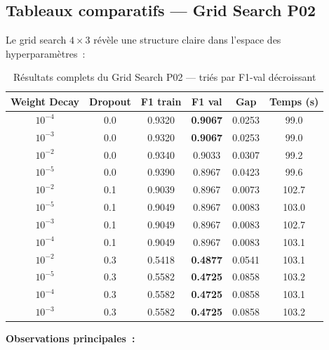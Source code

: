 \documentclass[12pt,a4paper]{article}
\newcommand{\best}[1]{\textcolor{bestgreen}{\textbf{#1}}}
\newcommand{\warn}[1]{\textcolor{warnred}{\textbf{#1}}}
\begin{document}
\subsection{Tableaux comparatifs — Grid Search P02}
\label{ssec:grid_results}

Le grid search $4 \times 3$ révèle une structure claire dans l'espace des
hyperparamètres~:

\begin{table}[H]
  \centering
  \caption{Résultats complets du Grid Search P02 — triés par F1-val décroissant}
  \label{tab:grid_results}
  \begin{tabular}{cccccc}
    \toprule
    \textbf{Weight Decay} & \textbf{Dropout} & \textbf{F1 train}
    & \textbf{F1 val} & \textbf{Gap} & \textbf{Temps (s)} \\
    \midrule
    \rowcolor{bestgreen!15}
    $10^{-4}$ & 0.0 & 0.9320 & \best{0.9067} & 0.0253 &  99.0 \\
    \rowcolor{bestgreen!15}
    $10^{-3}$ & 0.0 & 0.9320 & \best{0.9067} & 0.0253 &  99.0 \\
    $10^{-2}$ & 0.0 & 0.9340 & 0.9033       & 0.0307 &  99.2 \\
    $10^{-5}$ & 0.0 & 0.9390 & 0.8967       & 0.0423 &  99.6 \\
    $10^{-2}$ & 0.1 & 0.9039 & 0.8967       & 0.0073 & 102.7 \\
    $10^{-5}$ & 0.1 & 0.9049 & 0.8967       & 0.0083 & 103.0 \\
    $10^{-3}$ & 0.1 & 0.9049 & 0.8967       & 0.0083 & 102.7 \\
    $10^{-4}$ & 0.1 & 0.9049 & 0.8967       & 0.0083 & 103.1 \\
    \rowcolor{warnred!10}
    $10^{-2}$ & 0.3 & 0.5418 & \warn{0.4877} & 0.0541 & 103.1 \\
    \rowcolor{warnred!10}
    $10^{-5}$ & 0.3 & 0.5582 & \warn{0.4725} & 0.0858 & 103.2 \\
    \rowcolor{warnred!10}
    $10^{-4}$ & 0.3 & 0.5582 & \warn{0.4725} & 0.0858 & 103.1 \\
    \rowcolor{warnred!10}
    $10^{-3}$ & 0.3 & 0.5582 & \warn{0.4725} & 0.0858 & 103.2 \\
    \bottomrule
  \end{tabular}
\end{table}

\textbf{Observations principales~:}
\end{document}
